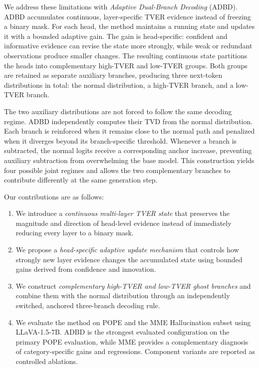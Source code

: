 We address these limitations with \emph{Adaptive Dual-Branch Decoding} (ADBD). ADBD accumulates continuous, layer-specific TVER evidence instead of freezing a binary mask. For each head, the method maintains a running state and updates it with a bounded adaptive gain. The gain is head-specific: confident and informative evidence can revise the state more strongly, while weak or redundant observations produce smaller changes. The resulting continuous state partitions the heads into complementary high-TVER and low-TVER groups. Both groups are retained as separate auxiliary branches, producing three next-token distributions in total: the normal distribution, a high-TVER branch, and a low-TVER branch.

The two auxiliary distributions are not forced to follow the same decoding regime. ADBD independently computes their TVD from the normal distribution. Each branch is reinforced when it remains close to the normal path and penalized when it diverges beyond its branch-specific threshold. Whenever a branch is subtracted, the normal logits receive a corresponding anchor increase, preventing auxiliary subtraction from overwhelming the base model. This construction yields four possible joint regimes and allows the two complementary branches to contribute differently at the same generation step.

Our contributions are as follows:
\begin{enumerate}
    \item We introduce a \emph{continuous multi-layer TVER state} that preserves the magnitude and direction of head-level evidence instead of immediately reducing every layer to a binary mask.
    \item We propose a \emph{head-specific adaptive update mechanism} that controls how strongly new layer evidence changes the accumulated state using bounded gains derived from confidence and innovation.
    \item We construct \emph{complementary high-TVER and low-TVER ghost branches} and combine them with the normal distribution through an independently switched, anchored three-branch decoding rule.
    \item We evaluate the method on POPE and the MME Hallucination subset using LLaVA-1.5-7B. ADBD is the strongest evaluated configuration on the primary POPE evaluation, while MME provides a complementary diagnosis of category-specific gains and regressions. Component variants are reported as controlled ablations.
\end{enumerate}

